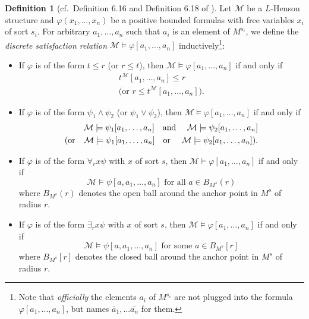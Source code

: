 \documentclass[11pt]{amsart}
\theoremstyle{definition}
\newtheorem{definition}[theorem]{Definition}
\theoremstyle{remark}
\begin{document}
\begin{definition}[cf.\ Definition 6.16 and Definition 6.18 of \cite{DI2017}]
Let $\mathcal{M}$ be a $L$-Henson structure and $\varphi(x_1,\ldots,x_n)$ be a positive bounded formulas with free variables $x_i$ of sort $s_i$. For arbitrary $a_1,\ldots, a_n$ such that $a_i$ is an element of $M^{s_i}$, we define the \emph{discrete satisfaction relation} $\mathcal{M}\models \varphi[a_1,\ldots,a_n]$ inductively\footnote{Note that \emph{officially} the  elements $a_i$ of  $M^{s_i}$ are not plugged into the formula $\varphi[a_1,...,a_n]$, but names
$\bar{a}_1,...\bar{a_n}$ for them.}:
\begin{itemize}
    \item If $\varphi$ is of the form $t\leq r$ (or $r\leq t$), then $\mathcal{M}\models \varphi[a_1,\ldots,a_n]$ if and only if 
    \begin{eqnarray*}
    t^{\mathcal{M}}[a_1,\ldots,a_n]\leq r \\
   \text{(or } r\leq t^{\mathcal{M}}[a_1,\ldots,a_n]).
    \end{eqnarray*}
    \item If $\varphi$ is of the form $\psi_1\wedge \psi_2$ (or $\psi_1\vee \psi_2$), then $\mathcal{M}\models \varphi[a_1,\ldots,a_n]$ if and only if
   \begin{eqnarray*}
     && \mathcal{M}\models \psi_1[a_1,\ldots,a_n] \text{\quad and \quad} \mathcal{M}\models\psi_2[a_1,\ldots,a_n]\\
    \text{(or} && \mathcal{M}\models \psi_1[a_1,\ldots,a_n] \text{\quad or \quad} \mathcal{M}\models \psi_2[a_1,\ldots,a_n]).
   \end{eqnarray*} 
    \item If $\varphi$ is of the form $\forall_rx\psi$ with $x$ of sort $s$, then $\mathcal{M}\models \varphi[a_1,\ldots,a_n]$ if and only if $$\mathcal{M}\models \psi[a,a_1,\ldots,a_n] \text{ for all } a\in  B_{M^{s}}(r)$$    
    where $ B_{M^{s}}(r)$ denotes the open ball around the anchor point in $M^{s}$ of radius $r$.

    \item If $\varphi$ is of the form $\exists_rx\psi$ with $x$ of sort $s$, then $\mathcal{M}\models \varphi[a_1,\ldots,a_n]$ if and only if $$\mathcal{M}\models \psi[a,a_1,\ldots,a_n] \text{ for some } a\in B_{M^{s}}[r]$$  
     where $ B_{M^{s}}[r]$ denotes the closed ball around the anchor point in $M^{s}$ of radius $r$.
\end{itemize}



\end{definition}
\end{document}
